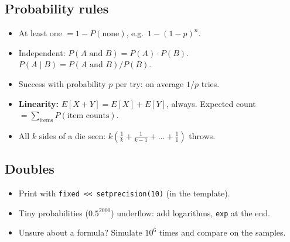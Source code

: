 \subsection{Probability rules}
\begin{tip}
\begin{itemize}
\item At least one $= 1 - P(\text{none})$, e.g.\ $1 - (1 - p)^n$.
\item Independent: $P(A \text{ and } B) = P(A) \cdot P(B)$.
  $P(A \mid B) = P(A \text{ and } B) / P(B)$.
\item Success with probability $p$ per try: on average $1/p$ tries.
\item \textbf{Linearity:} $E[X + Y] = E[X] + E[Y]$, always. Expected count
  $= \sum_{\text{items}} P(\text{item counts})$.
\item All $k$ sides of a die seen: $k(\frac1k + \frac1{k-1} + \dots + \frac11)$ throws.
\end{itemize}
\end{tip}

\label{t:expect}



\subsection{Doubles}
\begin{tip}
\begin{itemize}
\item Print with \texttt{fixed <{}< setprecision(10)} (in the template).
\item Tiny probabilities ($0.5^{2000}$) underflow: add logarithms, \texttt{exp} at the end.
\item Unsure about a formula? Simulate $10^6$ times and compare on the samples.
\end{itemize}
\end{tip}
